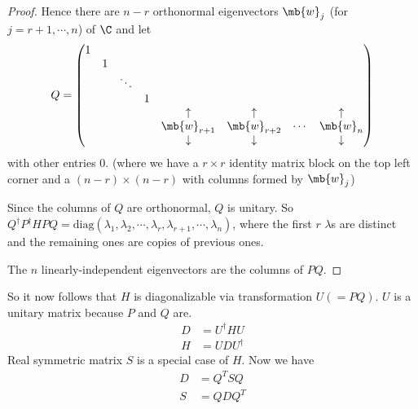 \documentclass[a4paper]{article}
\begin{document}
\begin{proof}
Hence there are $n -r $ orthonormal eigenvectors $\mb{w}_j$ (for $j = r + 1, \cdots, n$) of $\C$ and let
\[
Q = 
\begin{pmatrix}
  1 \\
  & 1\\
  && \ddots\\
  &&& 1\\
  &&&& \uparrow & \uparrow & &\uparrow\\
  &&&& \mb{w}_{r+1} & \mb{w}_{r + 2} & \cdots & \mb{w}_n\\
  &&&& \downarrow & \downarrow & &\downarrow\\
\end{pmatrix}
\]
with other entries $0$. (where we have a $r\times r$ identity matrix block on the top left corner and a $(n - r) \times (n -r)$ with columns formed by $\mb{w}_j$)

Since the columns of $Q$ are orthonormal, $Q$ is unitary. So $Q^\dagger P^\dagger HPQ = \mathrm{diag}(\lambda_1, \lambda_2, \cdots, \lambda_r, \lambda_{r + 1}, \cdots, \lambda_n)$, where the first $r$ $\lambda$s are distinct and the remaining ones are copies of previous ones.

The $n$ linearly-independent eigenvectors are the columns of $PQ$.

\end{proof}
So it now follows that $H$ is diagonalizable via transformation $U (=PQ)$. $U$ is a unitary matrix because $P$ and $Q$ are.
\begin{align*}
  D &= U^\dagger HU\\
  H &= UDU^\dagger
\end{align*}
Real symmetric matrix $S$ is a special case of $H$. Now we have
\begin{align*}
  D &= Q^T SQ\\
  S &= QDQ^T
\end{align*}
\end{document}
